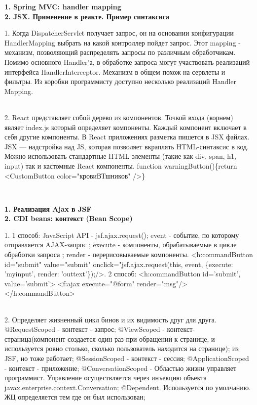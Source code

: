 \documentclass{article}
\newcommand{\bil}[4]{%
    \begin{minipage}{.3\textwidth}
        \textbf{1. #1} \\
        \textbf{2. #2}

        1. #3
        \\
        2. #4
    \end{minipage}
}
\begin{document}
\hfill
\bil{Spring MVC: handler mapping}{JSX. Применение в реакте. Пример синтаксиса}{
    Когда DispatcherServlet получает запрос, он на основании конфигурации HandlerMapping выбрать на какой контроллер пойдет запрос. 
    Этот mapping - механизм, позволяющий распределять запросы по различным обработчикам. Помимо основного Handler'а, в обработке
    запроса могут участвовать реализаций интерфейса HandlerInterceptor. Механизм в общем похож на сервлеты и
    фильтры. Из коробки программисту доступно несколько реализаций Handler Mapping.
}{
    React представляет собой дерево из компонентов. 
    Точкой входа (корнем) являет index.js который определяет компоненты. 
    Каждый компонент включает в себя другие компоненты.
    В React приложениях разметка пишется в JSX файлах. JSX — надстройка над JS, которая позволяет вкраплять HTML-синтаксис в код. 
    Можно использовать стандартные HTML элементы (такие как div, span, h1, input) так и кастомные React компоненты.
    function warningButton()\{return <CustomButton color="кровиВТшников" />\}
}
\\
\bil{Реализация Ajax в JSF}{CDI beans: контекст (Bean Scope)}{
1 способ: JavaScript API - jsf.ajax.request(); event - событие, по которому отправляется AJAX-запрос
; execute - компоненты, обрабатываемые в цикле обработки запроса
; render - перерисовываемые компоненты.
<h:commandButton id="submit" value="submit"
onclick="jsf.ajax.request(this, event, \{execute: 'myinput', render: 'outtext'\});/>.
2 способ: 
<h:commandButton id='submit', value='submit'> <f:ajax execute="@form" render="msg"/></h:commandButton>
}{Определяет жизненный цикл бинов и их видимость друг для друга.
    @RequestScoped - контекст - запрос;
@ViewScoped - контекст-страница(компонент создается один раз при обращении к странице, и используется ровно столько, сколько пользователь находится на странице); из JSF, но тоже работает;
@SessionScoped - контекст - сессия;
@ApplicationScoped - контекст - приложение;
@ConversationScoped - Областью жизни управляет программист. Управление осуществляется через инъекцию объекта javax.enterprise.context.Conversation;
@Dependent.  Используется по умолчанию. ЖЦ определяется тем где он был использован;}
\hfill
\end{document}
